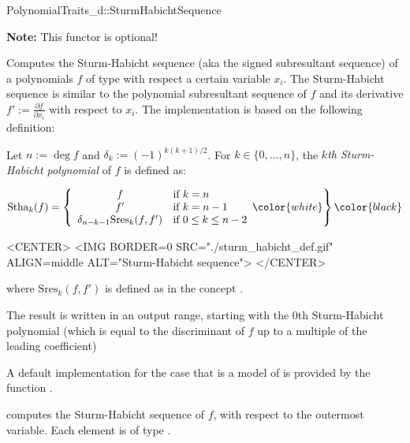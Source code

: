 \begin{ccRefConcept}{PolynomialTraits_d::SturmHabichtSequence}

\textbf{Note:} This functor is optional!

\ccDefinition

Computes the Sturm-Habicht sequence 
(aka the signed subresultant sequence)
of a polynomials $f$ of type 
 with respect a certain variable $x_i$.
The Sturm-Habicht sequence is similar to the polynomial subresultant sequence
of $f$ and its derivative $f':=\frac{\partial f}{\partial x_i}$
with respect to $x_i$. The implementation is based on the following definition:

Let $n:=\deg f$ and $\delta_k:=(-1)^{k(k+1)/2}$. 
For $k\in\{0,\ldots,n\}$, the {\it $k$th Sturm-Habicht polynomial} 
of $f$ is defined as:

\begin{ccTexOnly}
$$\mathrm{Stha}_k(f)=\left\{\begin{array}{cl}
f & \textrm{if\ } k=n\\
f' & \textrm{if\ } k=n-1\\
\delta_{n-k-1}\mathrm{Sres}_k(f,f') &\textrm{if\ } 0\leq k\leq n-2
\end{array}\color{white}\right\}\color{black}$$
\end{ccTexOnly}

\begin{ccHtmlOnly}
<CENTER>
<IMG BORDER=0 SRC="./sturm_habicht_def.gif" ALIGN=middle ALT="Sturm-Habicht sequence">
</CENTER>
\end{ccHtmlOnly}

where $\mathrm{Sres}_k(f,f')$ is defined 
as in the concept .

The result is written in an output range, 
starting with the $0$th Sturm-Habicht polynomial (which is equal to
the discriminant of $f$ up to a multiple of the leading coefficient)

A default implementation for the case that 
is a model of 
is provided by the function .

\ccOperations
{}
         { computes the Sturm-Habicht sequence of $f$, 
           with respect to the outermost variable. Each element is of type
           .}


\end{ccRefConcept}
